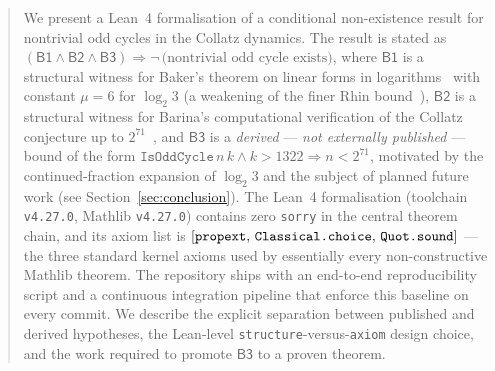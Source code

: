 
\begin{abstract}
We present a Lean~4 formalisation of a conditional non-existence result
for nontrivial odd cycles in the Collatz dynamics. The result is stated as
\((\mathsf{B1} \wedge \mathsf{B2} \wedge \mathsf{B3}) \Rightarrow \neg\,
\text{(nontrivial odd cycle exists)}\), where
\(\mathsf{B1}\) is a structural witness for Baker's theorem on linear
forms in logarithms~\cite{Baker1966} with constant \(\mu = 6\) for
\(\log_2 3\) (a weakening of the finer Rhin bound~\cite{Rhin1987}),
\(\mathsf{B2}\) is a structural witness for Barina's computational
verification of the Collatz conjecture up to \(2^{71}\)~\cite{Barina2025},
and \(\mathsf{B3}\) is a \emph{derived} --- \emph{not externally
published} --- bound of the form \(\mathtt{IsOddCycle}\,n\,k \wedge k >
1322 \Rightarrow n < 2^{71}\), motivated by the
continued-fraction expansion of \(\log_2 3\) and the subject of planned
future work (see Section~\ref{sec:conclusion}). The Lean~4 formalisation
(toolchain \texttt{v4.27.0}, Mathlib \texttt{v4.27.0}) contains zero
\texttt{sorry} in the central theorem chain, and its axiom list is
\([\text{\texttt{propext}},\, \text{\texttt{Classical.choice}},\,
\text{\texttt{Quot.sound}}]\) --- the three standard kernel axioms used
by essentially every non-constructive Mathlib theorem. The repository
ships with an end-to-end reproducibility script and a continuous
integration pipeline that enforce this baseline on every commit. We
describe the explicit separation between published and derived hypotheses,
the Lean-level \texttt{structure}-versus-\texttt{axiom} design choice, and
the work required to promote \(\mathsf{B3}\) to a proven theorem.
\end{abstract}
